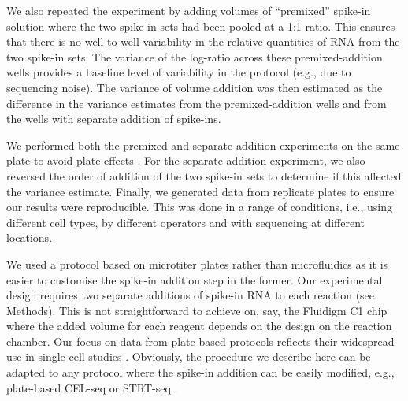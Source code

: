 \documentclass{article}
\begin{document}
We also repeated the experiment by adding volumes of ``premixed'' spike-in solution where the two spike-in sets had been pooled at a 1:1 ratio.
This ensures that there is no well-to-well variability in the relative quantities of RNA from the two spike-in sets.
The variance of the log-ratio across these premixed-addition wells provides a baseline level of variability in the protocol (e.g., due to sequencing noise).
The variance of volume addition was then estimated as the difference in the variance estimates from the premixed-addition wells and from the wells with separate addition of spike-ins.

We performed both the premixed and separate-addition experiments on the same plate to avoid plate effects \citep{hicks2015widespread,tung2016batch}.
For the separate-addition experiment, we also reversed the order of addition of the two spike-in sets to determine if this affected the variance estimate.
Finally, we generated data from replicate plates to ensure our results were reproducible.
This was done in a range of conditions, i.e., using different cell types, by different operators and with sequencing at different locations.

We used a protocol based on microtiter plates rather than microfluidics as it is easier to customise the spike-in addition step in the former.
Our experimental design requires two separate additions of spike-in RNA to each reaction (see Methods).
This is not straightforward to achieve on, say, the Fluidigm C1 chip where the added volume for each reagent depends on the design on the reaction chamber.
Our focus on data from plate-based protocols reflects their widespread use in single-cell studies \citep{segerstople2016single,islam2011characterization,wilson2015combined,scialdone2016resolving}.
Obviously, the procedure we describe here can be adapted to any protocol where the spike-in addition can be easily modified, e.g., plate-based CEL-seq \citep{hashimshony2016celseq2} or STRT-seq \citep{islam2011characterization}.
\end{document}

